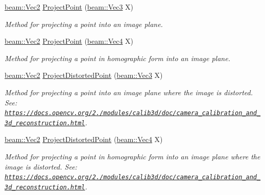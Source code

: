\begin{DoxyCompactItemize}
\hyperlink{group__utils_ga6112bda54e53755ab14060144285c6b0}{beam\+::\+Vec2} \hyperlink{classbeam__calibration_1_1_pinhole_a4834e766dc9c57b8c2cbc92f21173ebb}{Project\+Point} (\hyperlink{group__utils_ga7aca82b90a74cb643417801e830cd43f}{beam\+::\+Vec3} X)
\begin{DoxyCompactList}\small\item\em Method for projecting a point into an image plane. \end{DoxyCompactList}\item 
\hyperlink{group__utils_ga6112bda54e53755ab14060144285c6b0}{beam\+::\+Vec2} \hyperlink{classbeam__calibration_1_1_pinhole_a71b497379ab57ac3952563f3e0d62e88}{Project\+Point} (\hyperlink{group__utils_gae8c630e8f7e9cdbc1a7dcc3073a99d5c}{beam\+::\+Vec4} X)
\begin{DoxyCompactList}\small\item\em Method for projecting a point in homographic form into an image plane. \end{DoxyCompactList}\item 
\hyperlink{group__utils_ga6112bda54e53755ab14060144285c6b0}{beam\+::\+Vec2} \hyperlink{classbeam__calibration_1_1_pinhole_ade6c53821bc84a8795f5101ff49bfd36}{Project\+Distorted\+Point} (\hyperlink{group__utils_ga7aca82b90a74cb643417801e830cd43f}{beam\+::\+Vec3} X)
\begin{DoxyCompactList}\small\item\em Method for projecting a point into an image plane where the image is distorted. See\+: \href{https://docs.opencv.org/2.4/modules/calib3d/doc/camera_calibration_and_3d_reconstruction.html}{\tt https\+://docs.\+opencv.\+org/2./modules/calib3d/doc/camera\+\_\+calibration\+\_\+and\+\_\+3d\+\_\+reconstruction.\+html}. \end{DoxyCompactList}\item 
\hyperlink{group__utils_ga6112bda54e53755ab14060144285c6b0}{beam\+::\+Vec2} \hyperlink{classbeam__calibration_1_1_pinhole_a101b14c95d8ca7c73c0f4de01dd6605e}{Project\+Distorted\+Point} (\hyperlink{group__utils_gae8c630e8f7e9cdbc1a7dcc3073a99d5c}{beam\+::\+Vec4} X)
\begin{DoxyCompactList}\small\item\em Method for projecting a point in homographic form into an image plane where the image is distorted. See\+: \href{https://docs.opencv.org/2.4/modules/calib3d/doc/camera_calibration_and_3d_reconstruction.html}{\tt https\+://docs.\+opencv.\+org/2./modules/calib3d/doc/camera\+\_\+calibration\+\_\+and\+\_\+3d\+\_\+reconstruction.\+html}. \end{DoxyCompactList}\end{DoxyCompactItemize}


